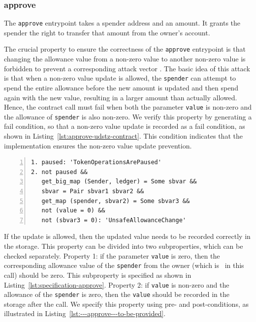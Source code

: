 \documentclass[a4paper,USenglish,cleveref, autoref, thm-restate]{lipics-v2021}
\begin{document}
\subsubsection{approve}
\label{sec:approve}

The \texttt{approve} entrypoint takes a spender address and an
amount. It grants the spender the right to transfer that amount from
the owner's account.

The crucial property to ensure the correctness of the \texttt{approve}
entrypoint is that changing the allowance value from a non-zero value
to another non-zero value is forbidden to prevent a corresponding
attack vector \cite{attack-vector}. The basic idea of this attack is
that when a non-zero value update is allowed, the \lstinline/spender/
can attempt to spend the entire allowance before the new amount is
updated and then spend again with the new value, resulting in a larger
amount than actually allowed. Hence, the contract call must fail when
both the parameter \lstinline/value/ is non-zero and the allowance of
\lstinline/spender/ is also non-zero. We verify this property by
generating a fail condition, so that a non-zero value update is
recorded as a fail condition, as shown in
Listing~\ref{lst:approve-udstz-contract}. This condition indicates
that the implementation ensures the non-zero value update prevention. 
\begin{lstlisting}[float=tp,captionpos=b,caption={Fail conditions for the \lstinline/approve/ entrypoint},label={lst:approve-udstz-contract},numbers=left]
1. paused: 'TokenOperationsArePaused'
2. not paused &&
   get_big_map (Sender, ledger) = Some sbvar &&
   sbvar = Pair sbvar1 sbvar2 &&
   get_map (spender, sbvar2) = Some sbvar3 &&
   not (value = 0) &&
   not (sbvar3 = 0): 'UnsafeAllowanceChange'
\end{lstlisting}
If the update is allowed, then the updated value needs to be recorded
correctly in the storage. This property can be divided into two
subproperties, which can be checked separately. Property 1: if the
parameter \lstinline/value/ is zero, then the 
corresponding allowance value of the \lstinline/spender/ from the
owner (which is \SENDER\ in this call) should be zero. This
subproperty is specified as shown in
Listing~\ref{lst:specification-approve}. Property 2: if
\lstinline/value/ is non-zero and the allowance of the \lstinline/spender/ is zero, then the \lstinline/value/ should be recorded in the storage after the call. We specify this property using pre- and post-conditions, as illustrated in Listing~\ref{lst:---approve---to-be-provided}.
\end{document}
